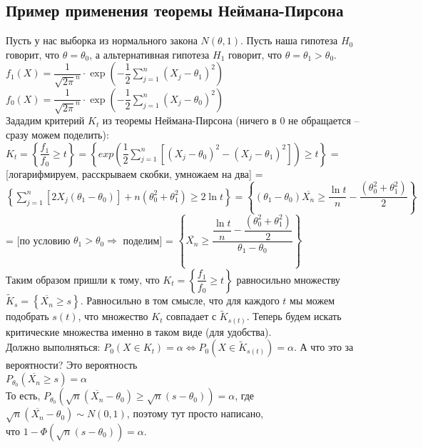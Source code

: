 \subsection{Пример применения теоремы Неймана-Пирсона}
\begin{example}
    Пусть у нас выборка из нормального закона $N(\theta, 1)$. Пусть наша гипотеза $H_0$ говорит, что
    $\theta = \theta_0$, а альтернативная гипотеза $H_1$ говорит, что $\theta = \theta_1 > \theta_0$. \\
    
    $f_1(X) = \dfrac{1}{\sqrt{2\pi}^n} \cdot \exp(-\dfrac{1}{2} \sum_{j = 1}^{n} (X_j - \theta_1)^2)$ \\
    $f_0(X) = \dfrac{1}{\sqrt{2\pi}^n} \cdot \exp(-\dfrac{1}{2} \sum_{j = 1}^{n} (X_j - \theta_0)^2)$ \\

    Зададим критерий $K_t$ из теоремы Неймана-Пирсона (ничего в 0 не обращается --
    сразу можем поделить): \\ $K_t = \left\{\dfrac{f_1}{f_0} \geqslant t\right\} =
    \left \{exp \left( \dfrac{1}{2} \sum_{j = 1}^{n}[(X_j - \theta_0)^2 - (X_j - \theta_1)^2] \right) \geqslant t \right \}$ =
    [логарифмируем, расскрываем скобки, умножаем на два]  = $\left \{\sum_{j = 1}^n[2X_j(\theta_1 - \theta_0)] +
     n(\theta_0^2 + \theta_1^2) \geqslant 2\ln t \right \} =
     \left \{(\theta_1 - \theta_0) \overline{X_n} \geqslant \dfrac{\ln t}{n} - \dfrac{(\theta_0^2 + \theta_1^2)}{2} \right \}$
     = [по условию $\theta_1 > \theta_0 \Rightarrow$ поделим] =
     $\left \{\overline{X_n} \geqslant \dfrac{\dfrac{\ln t}{n} - \dfrac{(\theta_0^2 + \theta_1^2)}{2}}{\theta_1 - \theta_0} \right \}$ \\
     
     Таким образом пришли к тому, что $K_t =\left\{\dfrac{f_1}{f_0} \geqslant t\right\}$ равносильно
     множеству $\widetilde{K}_{s} = \left \{\overline{X_n} \geqslant s \right \}$. Равносильно в
     том смысле, что для каждого $t$ мы можем подобрать $s(t)$, что множество $K_t$ совпадает с
     $\widetilde{K}_{s(t)}$. Теперь будем искать критические множества именно в таком виде (для удобства). \\
     
    Должно выполняться: $P_0(X \in K_t) = \alpha \Leftrightarrow P_0(X \in \widetilde{K}_{s(t)}) = \alpha$.
    А что это за вероятности? Это вероятность \\ $P_{\theta_0}(\overline{X_n} \geqslant s) = \alpha$ \\
    То есть, $P_{\theta_0}(\sqrt{n}(\overline{X_n} - \theta_0) \geqslant \sqrt{n}(s - \theta_0)) = \alpha$,
    где $\sqrt{n}(\overline{X_n} - \theta_0) \sim N(0, 1)$, поэтому тут просто написано,\\ что
    $1 - \Phi(\sqrt{n}(s - \theta_0)) = \alpha$. \\
    

\end{example}
